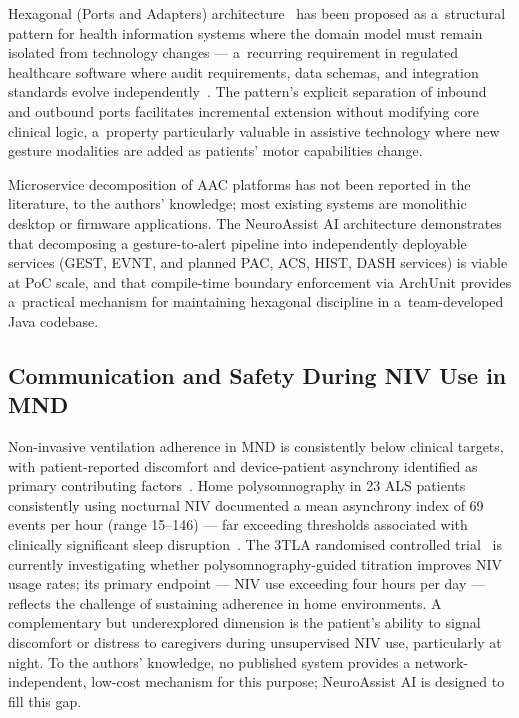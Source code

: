 Hexagonal (Ports and Adapters) architecture~\cite{cockburn2005hexagonal} has been
proposed as a~structural pattern for health information systems where the domain model
must remain isolated from technology changes — a~recurring requirement in regulated
healthcare software where audit requirements, data schemas, and integration standards
evolve independently~\cite{richardson2018microservices}. The pattern's explicit separation
of inbound and outbound ports facilitates incremental extension without modifying core
clinical logic, a~property particularly valuable in assistive technology where new
gesture modalities are added as patients' motor capabilities change.

Microservice decomposition of AAC platforms has not been reported in the literature, to
the authors' knowledge; most existing systems are monolithic desktop or firmware
applications. The NeuroAssist AI architecture demonstrates that decomposing a
gesture-to-alert pipeline into independently deployable services (GEST, EVNT, and planned
PAC, ACS, HIST, DASH services) is viable at PoC scale, and that compile-time boundary
enforcement via ArchUnit provides a~practical mechanism for maintaining hexagonal
discipline in a~team-developed Java codebase.

\subsection{Communication and Safety During NIV Use in MND}

Non-invasive ventilation adherence in MND is consistently below clinical targets, with patient-reported discomfort and device-patient asynchrony identified as primary contributing factors~\cite{berlowitz2021niv, yang2026pva}. Home polysomnography in 23 ALS patients consistently using nocturnal NIV documented a mean asynchrony index of 69 events per hour (range 15--146) — far exceeding thresholds associated with clinically significant sleep disruption~\cite{atkeson2011pva}. The 3TLA randomised controlled trial~\cite{berlowitz2025tla} is currently investigating whether polysomnography-guided titration improves NIV usage rates; its primary endpoint — NIV use exceeding four hours per day — reflects the challenge of sustaining adherence in home environments. A complementary but underexplored dimension is the patient's ability to signal discomfort or distress to caregivers during unsupervised NIV use, particularly at night. To the authors' knowledge, no published system provides a network-independent, low-cost mechanism for this purpose; NeuroAssist AI is designed to fill this gap.